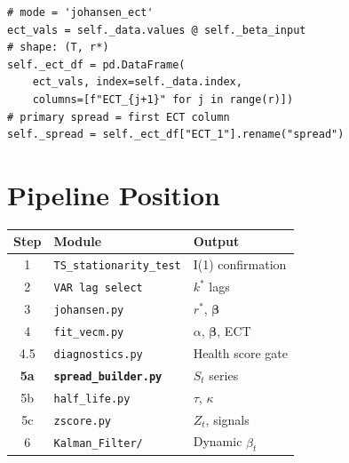 \documentclass[10pt,a4paper,twocolumn]{article}
\begin{document}
\begin{tcolorbox}[codebox={Johansen ECT construction}]
\begin{lstlisting}[style=pythonplain]
# mode = 'johansen_ect'
ect_vals = self._data.values @ self._beta_input
# shape: (T, r*)
self._ect_df = pd.DataFrame(
    ect_vals, index=self._data.index,
    columns=[f"ECT_{j+1}" for j in range(r)])
# primary spread = first ECT column
self._spread = self._ect_df["ECT_1"].rename("spread")
\end{lstlisting}
\end{tcolorbox}

\section{Pipeline Position}

\begin{center}
{\small
\begin{tabular}{@{}clp{2.0cm}@{}}
\toprule
Step & Module & Output\\
\midrule
1 & \texttt{TS\_stationarity\_test} & I(1) confirmation\\
2 & \texttt{VAR lag select} & $k^*$ lags\\
3 & \texttt{johansen.py} & $r^*$, $\boldsymbol\beta$\\
4 & \texttt{fit\_vecm.py} & $\alpha$, $\boldsymbol\beta$, ECT\\
4.5 & \texttt{diagnostics.py} & Health score gate\\
\textbf{5a} & \textbf{\texttt{spread\_builder.py}} & $S_t$ series\\
5b & \texttt{half\_life.py} & $\tau$, $\kappa$\\
5c & \texttt{zscore.py} & $Z_t$, signals\\
6 & \texttt{Kalman\_Filter/} & Dynamic $\hat\beta_t$\\
\bottomrule
\end{tabular}
}
\end{center}
\end{document}
